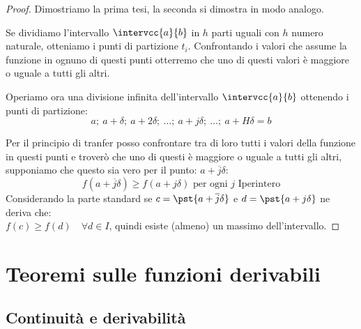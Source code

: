 \begin{proof}
Dimostriamo la prima tesi, la seconda si dimostra in modo analogo.

\vspace{-10mm}                           %
\begin{minipage}{.56\textwidth}
Se dividiamo l'intervallo \(\intervcc{a}{b}\) in \(h\) parti uguali 
con \(h\) numero naturale, 
otteniamo i punti di partizione \(t_i\). Confrontando i valori che assume 
la funzione in ognuno di questi punti otterremo che uno di questi valori è 
maggiore o uguale a tutti gli altri.

Operiamo ora una divisione infinita dell'intervallo \(\intervcc{a}{b}\)
ottenendo i punti di partizione: 
\[a;~a+\delta;~a+2\delta;~\dots;~a+j\delta;~\dots;~a+H\delta=b\]
\end{minipage}
\hfill
\begin{minipage}{.42\textwidth}
\vspace*{-25mm}                           %
\begin{center} \scalebox{.9}{\tweierstrass} \end{center}
\end{minipage}

\vspace{-10mm}                           %
Per il principio di tranfer posso confrontare tra di loro tutti i valori 
della funzione in questi punti e troverò che uno di questi è maggiore o 
uguale a tutti gli altri, supponiamo che questo sia vero per il punto: 
\(a+\overline{j}\delta\):
\[f(a+\overline{j}\delta) \geqslant f(a+j\delta) 
  \text{ per ogni } j \text{ Iperintero}\]
Considerando la parte standard 
se \(c=\pst{a+\overline{j}\delta}\) e \(d=\pst{a+j\delta}\)
ne deriva che: \\
\(f(c) \geqslant f(d) \quad \forall d \in I\), quindi esiste (almeno) un 
massimo dell'intervallo.
\end{proof}

\section{Teoremi sulle funzioni derivabili}
\label{subsec:cont_definizione}

\subsection{Continuità e derivabilità}
\label{subsec:cont_contderiv}


